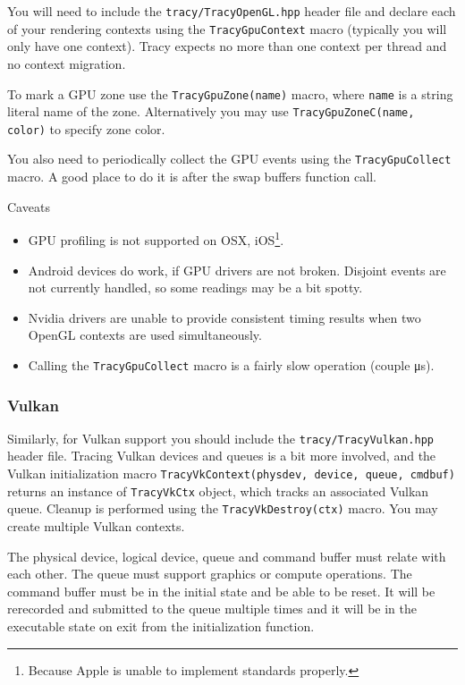 \documentclass[hidelinks,titlepage,a4paper]{article}
\begin{document}
You will need to include the \texttt{tracy/TracyOpenGL.hpp} header file and declare each of your rendering contexts using the \texttt{TracyGpuContext} macro (typically you will only have one context). Tracy expects no more than one context per thread and no context migration.

To mark a GPU zone use the \texttt{TracyGpuZone(name)} macro, where \texttt{name} is a string literal name of the zone. Alternatively you may use \texttt{TracyGpuZoneC(name, color)} to specify zone color.

You also need to periodically collect the GPU events using the \texttt{TracyGpuCollect} macro. A good place to do it is after the swap buffers function call.

\begin{bclogo}[
noborder=true,
couleur=black!5,
logo=\bcattention
]{Caveats}
\begin{itemize}
\item GPU profiling is not supported on OSX, iOS\footnote{Because Apple is unable to implement standards properly.}.
\item Android devices do work, if GPU drivers are not broken. Disjoint events are not currently handled, so some readings may be a bit spotty.
\item Nvidia drivers are unable to provide consistent timing results when two OpenGL contexts are used simultaneously.
\item Calling the \texttt{TracyGpuCollect} macro is a fairly slow operation (couple \si{\micro\second}).
\end{itemize}
\end{bclogo}

\subsubsection{Vulkan}

Similarly, for Vulkan support you should include the \texttt{tracy/TracyVulkan.hpp} header file. Tracing Vulkan devices and queues is a bit more involved, and the Vulkan initialization macro \texttt{TracyVkContext(physdev, device, queue, cmdbuf)} returns an instance of \texttt{TracyVkCtx} object, which tracks an associated Vulkan queue. Cleanup is performed using the \texttt{TracyVkDestroy(ctx)} macro. You may create multiple Vulkan contexts.

The physical device, logical device, queue and command buffer must relate with each other. The queue must support graphics or compute operations. The command buffer must be in the initial state and be able to be reset. It will be rerecorded and submitted to the queue multiple times and it will be in the executable state on exit from the initialization function.
\end{document}
